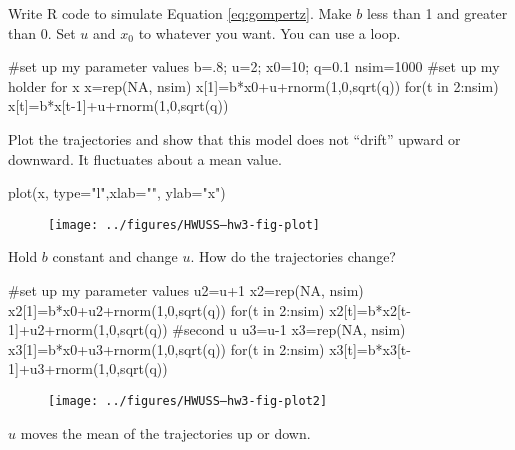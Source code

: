 \begin{wideitemize}
\item Write R code to simulate Equation \ref{eq:gompertz}.  Make $b$ less than 1 and greater than 0.  Set $u$ and $x_0$ to whatever you want.  You can use a \verb@for@ loop. 
\begin{Schunk}
\begin{Sinput}
 #set up my parameter values
 b=.8; u=2; x0=10; q=0.1
 nsim=1000
 #set up my holder for x
 x=rep(NA, nsim)
 x[1]=b*x0+u+rnorm(1,0,sqrt(q))
 for(t in 2:nsim) x[t]=b*x[t-1]+u+rnorm(1,0,sqrt(q))
\end{Sinput}
\end{Schunk}

\item Plot the trajectories and show that this model does not ``drift'' upward or downward.  It fluctuates about a mean value.
\begin{Schunk}
\begin{Sinput}
 plot(x, type="l",xlab="", ylab="x")
\end{Sinput}
\end{Schunk}
\begin{figure}[htp]
\begin{center}
\texttt{[image: ../figures/HWUSS--hw3-fig-plot]}
\end{center}
\end{figure}

\item Hold $b$ constant and change $u$.  How do the trajectories change?
\begin{Schunk}
\begin{Sinput}
 #set up my parameter values
 u2=u+1
 x2=rep(NA, nsim)
 x2[1]=b*x0+u2+rnorm(1,0,sqrt(q))
 for(t in 2:nsim) x2[t]=b*x2[t-1]+u2+rnorm(1,0,sqrt(q))
 #second u
 u3=u-1
 x3=rep(NA, nsim)
 x3[1]=b*x0+u3+rnorm(1,0,sqrt(q))
 for(t in 2:nsim) x3[t]=b*x3[t-1]+u3+rnorm(1,0,sqrt(q))
 
\end{Sinput}
\end{Schunk}
\begin{figure}[htp]
\begin{center}
\texttt{[image: ../figures/HWUSS--hw3-fig-plot2]}
\end{center}
\end{figure}
$u$ moves the mean of the trajectories up or down.



\end{wideitemize}
